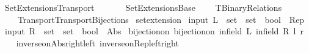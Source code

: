 %
\begin{isabellebody}%
%
%
\isadelimdocument
%
\endisadelimdocument
%
\isatagdocument
%
\isamarkuptrue%
%
\endisatagdocument
{\isafolddocument}%
%
\isadelimdocument
%
\endisadelimdocument
%
\isadelimtheory
%
\endisadelimtheory
%
\isatagtheory
{}\isamarkupfalse%
\ Set{\isacharunderscore}{\kern0pt}Extensions{\isacharunderscore}{\kern0pt}Transport\isanewline
\ \ \isanewline
\ \ \ \ Set{\isacharunderscore}{\kern0pt}Extensions{\isacharunderscore}{\kern0pt}Base\isanewline
\ \ \ \ TBinary{\isacharunderscore}{\kern0pt}Relations\isanewline
\ \ \ \ Transport{\isachardot}{\kern0pt}Transport{\isacharunderscore}{\kern0pt}Bijections\isanewline
{}%
\endisatagtheory
{\isafoldtheory}%
%
\isadelimtheory
\isanewline
%
\endisadelimtheory
\isanewline
{}\isamarkupfalse%
\ set{\isacharunderscore}{\kern0pt}extension\isanewline
{}\isanewline
\isanewline
{}\isamarkupfalse%
\ {\isacharparenleft}{\kern0pt}input{\isacharparenright}{\kern0pt}\ {\isachardoublequoteopen}L\ {\isacharcolon}{\kern0pt}{\isacharcolon}{\kern0pt}\ set\ {\isasymRightarrow}\ set\ {\isasymRightarrow}\ bool\ {\isasymequiv}\ {\isacharparenleft}{\kern0pt}{\isacharequal}{\kern0pt}\isactrlbsub Rep\isactrlesub {\isacharparenright}{\kern0pt}{\isachardoublequoteclose}\isanewline
{}\isamarkupfalse%
\ {\isacharparenleft}{\kern0pt}input{\isacharparenright}{\kern0pt}\ {\isachardoublequoteopen}R\ {\isacharcolon}{\kern0pt}{\isacharcolon}{\kern0pt}\ set\ {\isasymRightarrow}\ set\ {\isasymRightarrow}\ bool\ {\isasymequiv}\ {\isacharparenleft}{\kern0pt}{\isacharequal}{\kern0pt}\isactrlbsub Abs\isactrlesub {\isacharparenright}{\kern0pt}{\isachardoublequoteclose}\isanewline
\isanewline
{}\isamarkupfalse%
\ bijection{\isacharunderscore}{\kern0pt}on{\isacharcolon}{\kern0pt}\ {\isachardoublequoteopen}bijection{\isacharunderscore}{\kern0pt}on\ {\isacharparenleft}{\kern0pt}in{\isacharunderscore}{\kern0pt}field\ L{\isacharparenright}{\kern0pt}\ {\isacharparenleft}{\kern0pt}in{\isacharunderscore}{\kern0pt}field\ R{\isacharparenright}{\kern0pt}\ l\ r{\isachardoublequoteclose}\isanewline
%
\isadelimproof
\ \ %
\endisadelimproof
%
\isatagproof
{}\isamarkupfalse%
\ inverse{\isacharunderscore}{\kern0pt}on{\isacharunderscore}{\kern0pt}Abs{\isacharunderscore}{\kern0pt}right{\isacharunderscore}{\kern0pt}left\ inverse{\isacharunderscore}{\kern0pt}on{\isacharunderscore}{\kern0pt}Rep{\isacharunderscore}{\kern0pt}left{\isacharunderscore}{\kern0pt}right\isanewline

\end{isabellebody}
